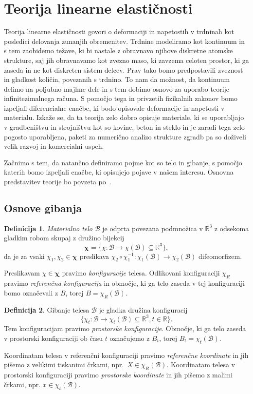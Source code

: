 \documentclass[12pt,a4paper,twoside]{article}
\theoremstyle{definition} %
\newtheorem{definicija}{Definicija}[section]
\theoremstyle{plain} %
\numberwithin{equation}{section}
\newcommand{\R}{\mathbb R}
\newcommand{\B}{\mathcal{B}}
\renewcommand{\b}{\boldsymbol}
\newcommand{\vX}{X}
\newcommand{\vx}{x}
\begin{document}
\section{Teorija linearne elastičnosti}
\label{sec:mehanika}
Teorija linearne elastičnosti govori o deformaciji in napetostih v trdninah kot posledici delovanja
zunanjih obremenitev. Trdnine modeliramo kot kontinuum in s tem zaobidemo težave, ki bi nastale z
obravnavo njihove diskretne atomske strukture, saj jih obravnavamo kot zvezno maso, ki zavzema
celoten prostor, ki ga zaseda in ne kot diskreten sistem delcev. Prav tako bomo predpostavili
zveznost in gladkost količin, povezanih s trdnino. To nam da možnost, da kontinuum delimo na
poljubno majhne dele in s tem dobimo osnovo za uporabo teorije infinitezimalnega računa. S pomočjo
tega in privzetih fizikalnih zakonov bomo izpeljali diferencialne enačbe, ki bodo opisovale
deformacije in napetosti v materialu. Izkaže se, da ta teorija zelo dobro opisuje materiale, ki se
uporabljajo v gradbeništvu in strojništvu kot so kovine, beton in steklo in je zaradi tega zelo pogosto
uporabljena, paketi za numerično analizo strukture zgradb pa so doživeli velik razvoj in komercialni
uspeh.

Začnimo s tem, da natančno definiramo pojme kot so telo in gibanje, s pomočjo katerih bomo izpeljali
enačbe, ki opisujejo pojave v našem interesu. Osnovna predstavitev teorije bo povzeta
po~\cite{slaughter2012linearized}.

\subsection{Osnove gibanja}

\begin{definicija}
  \emph{Materialno telo} $\B$ je odprta povezana podmnožica v $\R^3$ z odsekoma gladkim
  robom skupaj z družino bijekcij
  \[
    \b\chi = \{\chi \colon\B\to\chi(\B) \subseteq \R^3\},
  \]
  da je za vsaki $\chi_1, \chi_2 \in \b\chi$ preslikava
  $\chi_2\circ\chi_1^{-1}\colon \chi_1(\B) \to \chi_2(\B)$
  difeomorfizem.

  Preslikavam $\chi \in \b\chi$ pravimo \emph{konfiguracije} telesa. Odlikovani
  konfiguraciji $\chi_R$ pravimo \emph{referenčna konfiguracija} in območje, ki
  ga telo zaseda v tej konfiguraciji bomo označevali z $B$, torej $B =
  \chi_R(\B)$.
\end{definicija}

\begin{definicija}
  \label{def:gibanje}
  Gibanje telesa $\B$ je gladka družina konfiguracij
  \[
    \{\chi_t\colon \B \to\chi_t(\B) \subseteq \R^3, t \in \R\}.
  \]
  Tem konfiguracijam pravimo \emph{prostorske konfiguracije}. Območje, ki ga
  telo zaseda v prostorski konfiguraciji ob času $t$ označujemo z $B_t$, torej
  $B_t = \chi_t(\B)$.
\end{definicija}
Koordinatam telesa v referenčni konfiguraciji pravimo \emph{referenčne
koordinate} in jih pišemo z velikimi tiskanimi črkami, npr.\ $\vX \in \chi_R(\B)$.
Koordinatam telesa v prostorski konfiguraciji pravimo \emph{prostorske
koordinate} in jih pišemo z malimi črkami, npr. $\vx \in \chi_t(\B)$.
\end{document}
